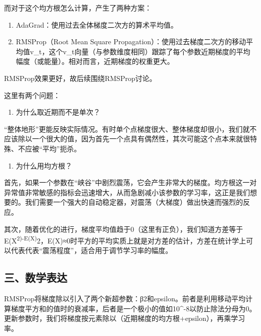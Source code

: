 而对于这个均方根怎么计算，产生了两种方案：

\begin{enumerate}
\def\labelenumi{\arabic{enumi}.}
\item
  AdaGrad：使用过去全体梯度二次方的算术平均值。
\item
  RMSProp（Root Mean Square Propagation）：使用过去梯度二次方的移动平均值v\_t，这个v\_t向量（与参数维度相同）跟踪了每个参数近期梯度的平均幅度（或能量）。相对而言，近期梯度的权重更大。
\end{enumerate}

RMSProp效果更好，故后续围绕RMSProp讨论。

这里有两个问题：

\begin{enumerate}
\def\labelenumi{\arabic{enumi}.}
\tightlist
\item
  为什么取近期而不是单次？
\end{enumerate}

``整体地形''更能反映实际情况。有时单个点梯度很大、整体梯度却很小，我们就不应该除以一个很大的值，因为首先一个点具有偶然性，其次可能这个点本来就很特殊、不应被``平均''扼杀。

\begin{enumerate}
\def\labelenumi{\arabic{enumi}.}
\setcounter{enumi}{1}
\tightlist
\item
  为什么用均方根？
\end{enumerate}

首先，如果一个参数在``峡谷''中剧烈震荡，它会产生非常大的梯度。均方根这一对异常值非常敏感的指标会迅速增大，从而急剧减小该参数的学习率，这正是我们想要的。我们需要一个强大的自动稳定器，对震荡（大梯度）做出快速而强烈的反应。

其次，随着优化的进行，梯度平均值趋于0（这里有正负），我们知道方差等于E(X\textsuperscript{2)-E(X)}2，E(X)≈0时平方的平均实质上就是对方差的估计，方差在统计学上可以代表代表``震荡程度''，适合用于调节学习率的幅度。

\hypertarget{ux4e09ux6570ux5b66ux8868ux8fbe-1}{%
\subsection{三、数学表达}\label{ux4e09ux6570ux5b66ux8868ux8fbe-1}}

RMSProp将梯度除以引入了两个新超参数：β2和epsilon。前者是利用移动平均计算梯度平方和的值时的衰减率，后者是一个极小的值如10\^{}-8以防止除法分母为0。更新参数时，我们将梯度按元素除以（近期梯度的均方根+epsilon），再乘学习率。

